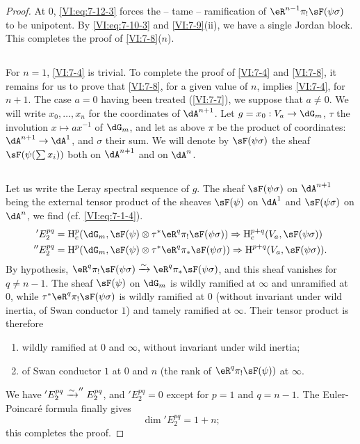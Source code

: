 \begin{proof}[Proof]
At $0$, \eqref{VI:eq:7-12-3} forces the -- tame -- ramification of
$\eR^{n-1} \pi_! \sF(\psi\sigma)$ to be unipotent. By
\eqref{VI:eq:7-10-3} and \ref{VI:7-9}(ii), we have a single Jordan block. This
completes the proof of \ref{VI:7-8}($n$). 





\subsection{}\label{VI:7-13}

For $n=1$, \ref{VI:7-4} is trivial. To complete the proof of \ref{VI:7-4} and
\ref{VI:7-8}, it remains for us to prove that \ref{VI:7-8}, for a given
value of $n$, implies \ref{VI:7-4}, for $n+1$. The case $a=0$ having been
treated (\ref{VI:7-7}), we suppose that $a\ne 0$. We will write $x_0,\dots,x_n$ for
the coordinates of $\dA^{n+1}$. Let $g=x_0:V_a\to \dG_m$, $\tau$
the involution $x\mapsto a x^{-1}$ of $\dG_m$, and let as above $\pi$ be the
product of coordinates: $\dA^{n+1} \to \dA^1$, and $\sigma$ their sum. We
will denote by $\sF(\psi\sigma)$ the sheaf $\sF(\psi(\sum x_i))$ both on $\dA^{n+1}$
and on $\dA^n$. 





\subsection{}\label{VI:7-14}

Let us write the Leray spectral sequence of $g$. The sheaf $\sF(\psi\sigma)$ on
$\dA^{n+1}$ being the external tensor product of the sheaves $\sF(\psi)$ on
$\dA^1$ and $\sF(\psi\sigma)$ on $\dA^n$, we find (cf. \eqref{VI:eq:7-1-4}). 
\begin{align*}
  'E_2^{p q} &= \h_c^p(\dG_m,\sF(\psi)\otimes \tau^\ast \eR^q \pi_! \sF(\psi\sigma)) \Rightarrow \h_c^{p+q}(V_a,\sF(\psi\sigma)) \\
  ''E_2^{p q} &= \h^p(\dG_m,\sF(\psi)\otimes \tau^\ast \eR^q \pi_\ast \sF(\psi\sigma)) \Rightarrow \h^{p+q}(V_a,\sF(\psi\sigma)) \text{.} 
\end{align*}
By hypothesis,
$\eR^q \pi_! \sF(\psi\sigma) \iso \eR^q \pi_\ast \sF(\psi\sigma)$, and this
sheaf vanishes for $q\ne n-1$. The sheaf $\sF(\psi)$ on $\dG_m$ is
wildly ramified at $\infty$ and unramified at $0$, while
$\tau^\ast \eR^q \pi_! \sF(\psi\sigma)$ is wildly ramified at $0$ (without
invariant under wild inertia, of Swan conductor $1$) and tamely
ramified at $\infty$. Their tensor product is therefore
\begin{enumerate}[\indent a)]
  \item wildly ramified at $0$ and $\infty$, without invariant under wild
    inertia;
  \item of Swan conductor $1$ at $0$ and $n$ (the rank of
    $\eR^q \pi_! \sF(\psi))$ at $\infty$.
\end{enumerate}
We have $'E_2^{p q} \xrightarrow\sim ''E_2^{p q}$, and $'E_2^{p q}=0$ except for $p=1$ and
$q=n-1$. The Euler-Poincaré formula finally gives 
\[
  \dim{'E_2^{p q}} = 1+n \text{;} 
\]
this completes the proof.
\end{proof}
